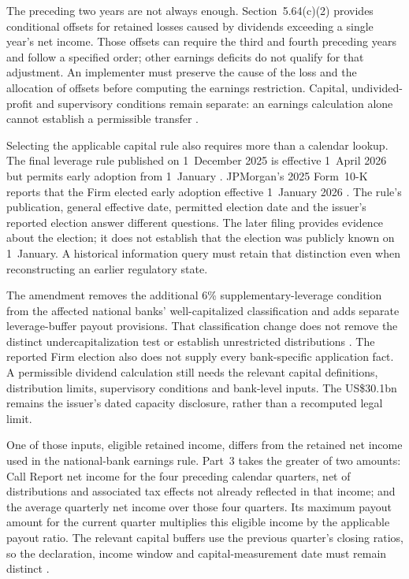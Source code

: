 The preceding two years are not always enough. Section~5.64(c)(2) provides
conditional offsets for retained losses caused by dividends exceeding a
single year's net income. Those offsets can require the third and fourth
preceding years and follow a specified order; other earnings deficits do not
qualify for that adjustment. An implementer must preserve the cause of the
loss and the allocation of offsets before computing the earnings restriction.
Capital, undivided-profit and supervisory conditions remain separate: an
earnings calculation alone cannot establish a permissible transfer
\citep[12~CFR~5.63--5.65]{occnationaldividends2026}.

Selecting the applicable capital rule also requires more than a calendar
lookup. The final leverage rule published on 1~December 2025 is effective
1~April 2026 but permits early adoption from 1~January
\citep[p.~55248]{eslrfinal2025}. JPMorgan's 2025
Form~10-K reports that the Firm elected early adoption effective 1~January
2026 \citep[p.~91]{jpmorgan2025tenk}.
The rule's publication, general effective date, permitted election date and
the issuer's reported election answer different questions. The later filing
provides evidence about the election; it does not establish that the election
was publicly known on 1~January. A historical information query must retain
that distinction even when reconstructing an earlier regulatory state.

The amendment removes the additional 6\% supplementary-leverage condition
from the affected national banks' well-capitalized classification and adds
separate leverage-buffer payout provisions. That classification change does
not remove the distinct undercapitalization test or establish unrestricted
distributions \citep[pp.~55287--55288]{eslrfinal2025}. The reported Firm election
also does not supply every bank-specific application fact. A permissible
dividend calculation still needs the relevant capital definitions, distribution
limits, supervisory conditions and bank-level inputs. The US\$30.1bn remains
the issuer's dated capacity disclosure, rather than a recomputed legal limit.


One of those inputs, eligible retained income, differs from the
retained net income used in the national-bank earnings rule. Part~3 takes the
greater of two amounts: Call Report net income for the four preceding calendar
quarters, net of distributions and associated tax effects not already reflected
in that income; and the average quarterly net income over those four quarters.
Its maximum payout amount for the current quarter multiplies this eligible
income by the applicable payout ratio. The relevant capital buffers use the
previous quarter's closing ratios, so the declaration, income window and
capital-measurement date must remain distinct
\citep[12~CFR~3.11(a)(2)--(4)]{occcapitalpayout2026}.


